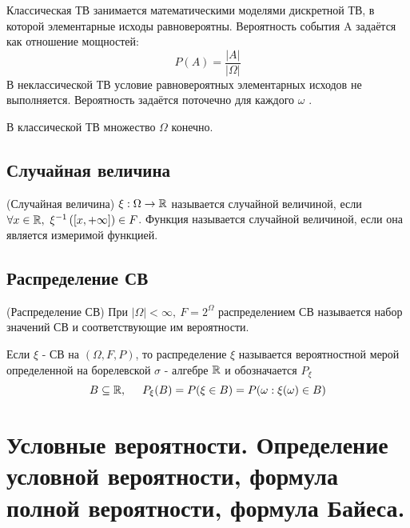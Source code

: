 \begin{multicols}{2}
    
    \begin{definition}{}{}
            Классическая ТВ занимается математическими моделями дискретной ТВ, в которой элементарные исходы равновероятны. Вероятность события A задаётся как отношение мощностей:
            \[
                P(A) = \dfrac{|A|}{|\Omega|}
            \]
            В неклассической ТВ условие равновероятных элементарных исходов не выполняется. Вероятность задаётся поточечно для каждого $\omega$ .
    \end{definition}
    \begin{note}
        В классической ТВ множество $\Omega$ конечно. 
    \end{note}
    \subsection*{Случайная величина}
    \begin{definition}{(Случайная величина)}{}
        $\xi:\Omega \to \mathbb{R}$ называется случайной величиной, если $\forall x \in \R,\ \xi^{-1}\left([x,+\infty]\right)\in F$. Функция называется случайной величиной, если она является измеримой функцией.
    \end{definition}
    \subsection*{Распределение СВ}
    \begin{definition}{(Распределение СВ)}{}
            При $|\Omega| < \infty,\ F = 2^{\Omega}$ распределением СВ называется набор значений СВ и соответствующие им вероятности.
    \end{definition}
    \begin{note}{}{}
        Если $\xi$ - СВ на $(\Omega, F, P)$, то распределение $\xi$ называется вероятностной мерой определенной на борелевской $\sigma$ - алгебре $\mathbb{R}$ и обозначается $P_\xi$ 
            \[
                B \subseteq \mathbb{R}, \hspace{0.5cm} P_\xi(B) = P(\xi \in B) = P(\omega: \xi(\omega) \in B)
            \]
    \end{note}
    \section{Условные вероятности. Определение условной вероятности, формула полной
    вероятности, формула Байеса.}

\end{multicols}
